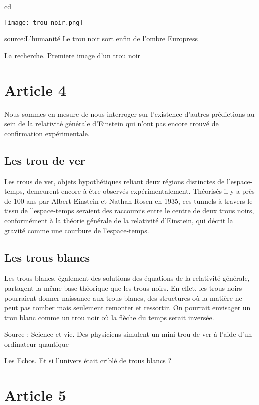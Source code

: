 cd\documentclass{article}
\begin{document}
\texttt{[image: trou\_noir.png]}

source:L'humanité Le trou noir sort enfin de l'ombre
Europress

La recherche. Premiere image d'un trou noir



\label{sec:article3} 

\section{Article 4} %

Nous sommes en mesure de nous interroger sur l'existence d'autres prédictions au sein de la relativité générale d'Einstein qui n'ont pas encore trouvé de confirmation expérimentale.
\subsection{Les trou de ver}
Les trous de ver, objets hypothétiques reliant deux régions distinctes de l'espace-temps, demeurent encore à être observés expérimentalement. Théorisés il y a près de 100 ans par Albert Einstein et Nathan Rosen en 1935, ces tunnels à travers le tissu de l'espace-temps seraient des raccourcis entre le centre de deux trous noirs, conformément à la théorie générale de la relativité d'Einstein, qui décrit la gravité comme une courbure de l'espace-temps. 
\subsection{Les trous blancs}
Les trous blancs, également des solutions des équations de la relativité générale, partagent la même base théorique que les trous noirs. En effet, les trous noirs pourraient donner naissance aux trous blancs, des structures où la matière ne peut pas tomber mais seulement remonter et ressortir. On pourrait envisager un trou blanc comme un trou noir où la flèche du temps serait inversée.



Source : Science et vie. Des physiciens simulent un mini trou de ver à l’aide d’un ordinateur quantique

Les Echos. Et si l'univers était criblé de trous blancs ?

\label{sec:article4} 

\section{Article 5}
\end{document}
